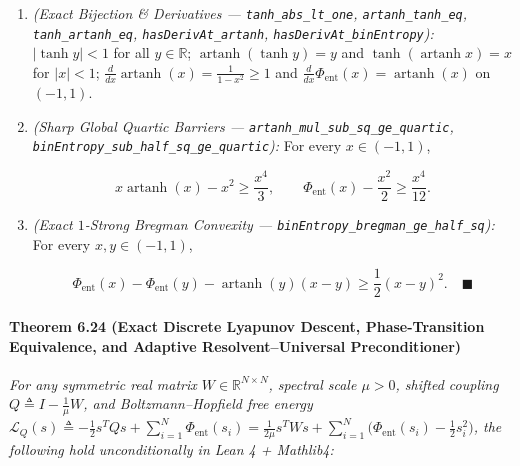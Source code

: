 \documentclass[
  11pt,
]{article}
\begin{document}
\begin{enumerate}
\def\labelenumi{\arabic{enumi}.}
\item
  \emph{(Exact Bijection \& Derivatives --- \texttt{tanh\_abs\_lt\_one},
  \texttt{artanh\_tanh\_eq}, \texttt{tanh\_artanh\_eq},
  \texttt{hasDerivAt\_artanh}, \texttt{hasDerivAt\_binEntropy}):}
  \(|\tanh y| < 1\) for all \(y \in \mathbb{R}\);
  \(\operatorname{artanh}(\tanh y) = y\) and
  \(\tanh(\operatorname{artanh} x) = x\) for \(|x| < 1\);
  \(\frac{d}{dx}\operatorname{artanh}(x) = \frac{1}{1 - x^2} \ge 1\) and
  \(\frac{d}{dx}\Phi_{\text{ent}}(x) = \operatorname{artanh}(x)\) on
  \((-1, 1)\).
\item
  \emph{(Sharp Global Quartic Barriers ---
  \texttt{artanh\_mul\_sub\_sq\_ge\_quartic},
  \texttt{binEntropy\_sub\_half\_sq\_ge\_quartic}):} For every
  \(x \in (-1, 1)\),

  \[x\operatorname{artanh}(x) - x^2 \ge \frac{x^4}{3}, \qquad \Phi_{\text{ent}}(x) - \frac{x^2}{2} \ge \frac{x^4}{12}.\]
\item
  \emph{(Exact \(1\)-Strong Bregman Convexity ---
  \texttt{binEntropy\_bregman\_ge\_half\_sq}):} For every
  \(x, y \in (-1, 1)\),

  \[\Phi_{\text{ent}}(x) - \Phi_{\text{ent}}(y) - \operatorname{artanh}(y)(x - y) \ge \frac{1}{2}(x - y)^2. \quad \blacksquare\]
\end{enumerate}

\paragraph{Theorem 6.24 (Exact Discrete Lyapunov Descent,
Phase-Transition Equivalence, and Adaptive Resolvent--Universal
Preconditioner)}\label{theorem-6.24-exact-discrete-lyapunov-descent-phase-transition-equivalence-and-adaptive-resolventuniversal-preconditioner}

\emph{For any symmetric real matrix \(W \in \mathbb{R}^{N \times N}\),
spectral scale \(\mu > 0\), shifted coupling
\(Q \triangleq I - \frac{1}{\mu}W\), and Boltzmann--Hopfield free energy
\(\mathcal{L}_Q(s) \triangleq -\frac{1}{2}s^T Q s + \sum_{i=1}^N \Phi_{\text{ent}}(s_i) = \frac{1}{2\mu}s^T W s + \sum_{i=1}^N \big(\Phi_{\text{ent}}(s_i) - \frac{1}{2}s_i^2\big)\),
the following hold unconditionally in Lean 4 + Mathlib4:}
\end{document}
